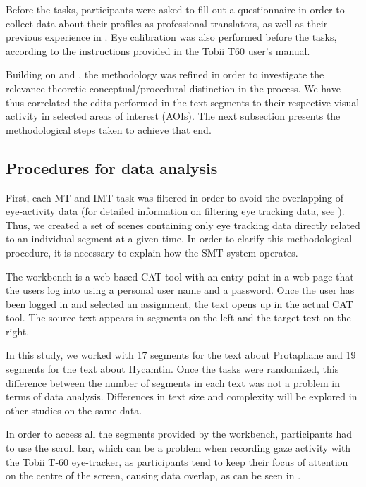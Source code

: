 \documentclass[output=paper]{langsci/langscibook}
\begin{document}
Before the  tasks, participants were asked to fill out a questionnaire in order to collect data about their profiles as professional translators, as well as their previous experience in . Eye calibration was also performed before the tasks, according to the instructions provided in the Tobii T60 user's manual.



Building on \citet{alves2012} and \citet{alves2013}, the methodology was refined in order to investigate the relevance-theoretic conceptual/procedural distinction in the  process. We have thus correlated the edits performed in the text segments to their respective visual activity in selected areas of interest (AOIs). The next subsection presents the methodological steps taken to achieve that end.


\subsection{Procedures for data analysis\label{alves:sec:ProceduresForDataAnalysis}}

First, each MT and IMT  task was filtered in order to avoid the overlapping of eye-activity data (for detailed information on filtering eye tracking data, see \citealt{alves2012}). Thus, we created a set of scenes containing only eye tracking data directly related to an individual segment at a given time. In order to clarify this methodological procedure, it is necessary to explain how the SMT system operates.  


The  workbench is a web-based CAT tool with an entry point in a web page that the users log into using a personal user name and a password. Once the user has been logged in and selected an assignment, the text opens up in the actual CAT tool. The source text appears in segments on the left and the target text on the right. 



In this study, we worked with 17 segments for the text about Protaphane and 19 segments for the text about Hycamtin. Once the  tasks were randomized, this difference between the number of segments in each text was not a problem in terms of data analysis. Differences in text size and complexity will be explored in other studies on the same data. 



In order to access all the segments provided by the  workbench,  participants had to use the scroll bar, which can be a problem when recording gaze activity with the Tobii T-60 eye-tracker, as participants tend to keep their focus of attention on the centre of the screen, causing data overlap, as can be seen in . 
\end{document}
